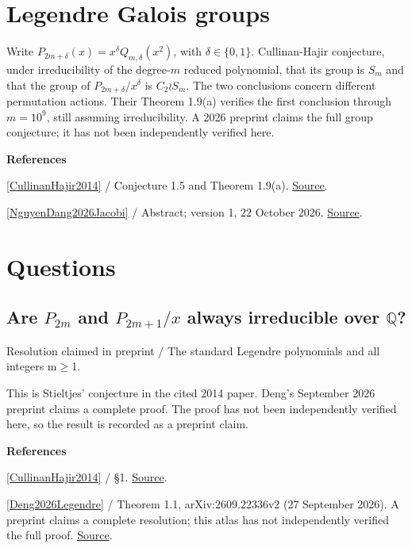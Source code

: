 \documentclass[11pt,a4paper,oneside,openany]{book}
\newenvironment{sources}{\par\smallskip\begingroup\footnotesize\color{atlasgray}\leftskip=10pt\setlength{\parskip}{2pt}}{\par\endgroup\smallskip}
\begin{document}
\section{Legendre Galois groups}
\color{black} Write \(P_{2m+\delta}(x)=x^\delta Q_{m,\delta}(x^2)\), with \(\delta\in\{0,1\}\). Cullinan-Hajir conjecture, under irreducibility of the degree-\(m\) reduced polynomial, that its group is \(S_m\) and that the group of \(P_{2m+\delta}/x^\delta\) is \(C_2\wr S_m\). The two conclusions concern different permutation actions. Their Theorem 1.9(a) verifies the first conclusion through \(m=10^9\), still assuming irreducibility. A 2026 preprint claims the full group conjecture; it has not been independently verified here.\par
\begin{sources}
\textbf{References}\par\smallskip
\noindent\hyperlink{ref:CullinanHajir2014}{[CullinanHajir2014]} / Conjecture 1.5 and Theorem 1.9(a).  \href{https://doi.org/10.1016/j.indag.2014.01.004}{Source}.\par
\noindent\hyperlink{ref:NguyenDang2026Jacobi}{[NguyenDang2026Jacobi]} / Abstract; version 1, 22 October 2026.  \href{https://hexagonmath.org/2610.00468v1}{Source}.\par
\end{sources}\color{black}
\section*{Questions}
\subsection*{Are \(P_{2m}\) and \(P_{2m+1}/x\) always irreducible over \(\mathbb Q\)?}
{\small\sffamily\color{atlasgold}Resolution claimed in preprint / The standard Legendre polynomials and all integers m\ensuremath{\ge}1.}\par\smallskip
\color{black} This is Stieltjes' conjecture in the cited 2014 paper. Deng's September 2026 preprint claims a complete proof. The proof has not been independently verified here, so the result is recorded as a preprint claim.\par
\begin{sources}
\textbf{References}\par\smallskip
\noindent\hyperlink{ref:CullinanHajir2014}{[CullinanHajir2014]} / §1.  \href{https://doi.org/10.1016/j.indag.2014.01.004}{Source}.\par
\noindent\hyperlink{ref:Deng2026Legendre}{[Deng2026Legendre]} / Theorem 1.1, arXiv:2609.22336v2 (27 September 2026). A preprint claims a complete resolution; this atlas has not independently verified the full proof. \href{https://arxiv.org/abs/2609.22336v2}{Source}.\par
\end{sources}\color{black}
\end{document}
